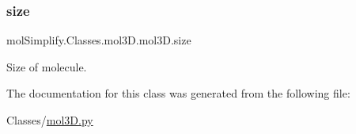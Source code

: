 \subsubsection{\texorpdfstring{size}{size}}
{\footnotesize\ttfamily mol\+Simplify.\+Classes.\+mol3\+D.\+mol3\+D.\+size}



Size of molecule. 



The documentation for this class was generated from the following file\+:\begin{DoxyCompactItemize}
\item 
Classes/\hyperlink{mol3D_8py}{mol3\+D.\+py}\end{DoxyCompactItemize}
